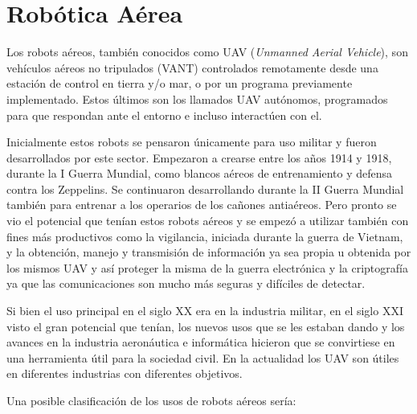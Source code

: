 \section{Robótica Aérea}
\hspace{1cm} Los robots aéreos, también conocidos como UAV (\textit{Unmanned Aerial Vehicle}), son vehículos aéreos no tripulados (VANT) controlados remotamente desde una estación de control en tierra y/o mar, o por un programa previamente implementado. Estos últimos son los llamados UAV autónomos, programados para que respondan ante el entorno e incluso interactúen con el.

\hspace{1cm} Inicialmente estos robots se pensaron únicamente para uso militar y fueron desarrollados por este sector. Empezaron a crearse entre los años 1914 y 1918, durante la I Guerra Mundial, como blancos aéreos de entrenamiento y defensa contra los Zeppelins. Se continuaron desarrollando durante la II Guerra Mundial también para entrenar a los operarios de los cañones antiaéreos. Pero pronto se vio el potencial que tenían estos robots aéreos y se empezó a utilizar también con fines más productivos como la vigilancia, iniciada durante la guerra de Vietnam,  y la obtención, manejo y transmisión de información ya sea propia u obtenida por los mismos UAV y así proteger la misma de la guerra electrónica y la criptografía ya que las comunicaciones son mucho más seguras y difíciles de detectar.

\hspace{1cm} Si bien el uso principal en el siglo XX era en la industria militar, en el siglo XXI visto el gran potencial que tenían, los nuevos usos que se les estaban dando y los avances en  la industria aeronáutica e informática hicieron que se convirtiese en una herramienta útil para la sociedad civil. En la actualidad los UAV son útiles en diferentes industrias con diferentes objetivos.

\hspace{1cm} Una posible clasificación de los usos de robots aéreos sería:

